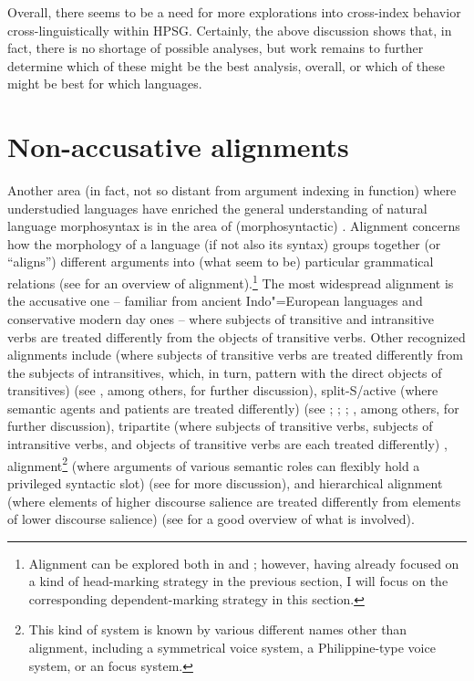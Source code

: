\documentclass[output=paper
 	        ,biblatex
                ,babelshorthands
                ,newtxmath
                ,draftmode
                ,colorlinks, citecolor=brown
]{langscibook}
\begin{document}
Overall, there seems to be a need for more explorations into cross-index behavior cross-linguistically within HPSG. Certainly, the above discussion shows that, in fact, there is no shortage of possible analyses, but work remains to further determine which of these might be the best analysis, overall, or which of these might be best for which languages.

\section{Non-accusative alignments}
\label{ul:sec-non-accusative-alignments}

Another area (in fact, not so distant from argument indexing in function) where understudied languages have enriched the general understanding of natural language morphosyntax is in the area of (morphosyntactic) . Alignment concerns how the morphology of a language (if not also its syntax) groups together (or ``aligns'') different arguments into (what seem to be) particular grammatical relations (see \citealt{bicknich09} for an overview of alignment).\footnote{Alignment can be explored both in  and  \citep{Nichols86a-u}; however, having already focused on a kind of head-marking strategy in the previous section, I will focus on the corresponding dependent-marking strategy in this section.} The most widespread alignment is the accusative one -- familiar from ancient Indo"=European languages and conservative modern day ones -- where subjects of transitive and intransitive verbs are treated differently from the objects of transitive verbs. Other recognized alignments include  (where subjects of transitive verbs are treated differently from the subjects of intransitives, which, in turn, pattern with the direct objects of transitives) (see \citealt{comrie78erg,plank79,dixon79,dixon94}, among others, for further discussion), split-S/active (where semantic agents and patients are treated differently) (see \citealt{klimov73,klimov74}; \citealt[Chapter~4]{dixon94}; \citealt{mithun91}; \citealt{wichdon08}, among others, for further discussion), tripartite (where subjects of transitive verbs, subjects of intransitive verbs, and objects of transitive verbs are each treated differently) \citep[39--40]{dixon94},  alignment\footnote{This kind of system is known by various different names other than  alignment, including a symmetrical voice system, a Philippine-type voice system, or an  focus system.} (where arguments of various semantic roles can flexibly hold a privileged syntactic slot) (see \citealt{schachter76,ross02,himmelmann05typchar} for more discussion), and hierarchical alignment (where elements of higher discourse salience are treated differently from elements of lower discourse salience) (see \citealt{jacqant14} for a good overview of what is involved).    
\end{document}
